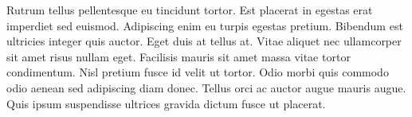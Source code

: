 \documentclass[11pt,a4paper,roman]{moderncv}        %
\begin{document}
Rutrum tellus pellentesque eu tincidunt tortor. Est placerat in egestas erat imperdiet sed euismod. Adipiscing enim eu turpis egestas pretium. Bibendum est ultricies integer quis auctor. Eget duis at tellus at. Vitae aliquet nec ullamcorper sit amet risus nullam eget. Facilisis mauris sit amet massa vitae tortor condimentum. Nisl pretium fusce id velit ut tortor. Odio morbi quis commodo odio aenean sed adipiscing diam donec. Tellus orci ac auctor augue mauris augue. Quis ipsum suspendisse ultrices gravida dictum fusce ut placerat.

\vspace{0.5cm}


\makeletterclosing
\end{document}
